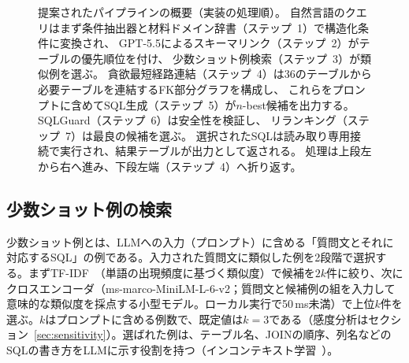 \documentclass[twocolumn]{interact}
\begin{document}
\begin{figure}[htbp]
{%
}%
\caption{提案されたパイプラインの概要（実装の処理順）。
  自然言語のクエリはまず条件抽出器と材料ドメイン辞書（ステップ~1）で構造化条件に変換され、
  GPT-5.5によるスキーマリンク（ステップ~2）がテーブルの優先順位を付け、
  少数ショット例検索（ステップ~3）が類似例を選ぶ。
  貪欲最短経路連結（ステップ~4）は36のテーブルから必要テーブルを連結するFK部分グラフを構成し、
  これらをプロンプトに含めてSQL生成（ステップ~5）が$n$-best候補を出力する。
  SQLGuard（ステップ~6）は安全性を検証し、
  リランキング（ステップ~7）は最良の候補を選ぶ。
  選択されたSQLは読み取り専用接続で実行され、結果テーブルが出力として返される。
  処理は上段左から右へ進み、下段左端（ステップ~4）へ折り返す。}
\label{fig:pipeline}
\end{figure}

\subsection{少数ショット例の検索}
\label{sec:fewshot}

少数ショット例とは、LLMへの入力（プロンプト）に含める「質問文とそれに対応するSQL」の例である。入力された質問文に類似した例を2段階で選択する。まずTF-IDF~\cite{salton1988tfidf}（単語の出現頻度に基づく類似度）で候補を$2k$件に絞り、次にクロスエンコーダ（ms-marco-MiniLM-L-6-v2；質問文と候補例の組を入力して意味的な類似度を採点する小型モデル。ローカル実行で50\,ms未満）で上位$k$件を選ぶ。$k$はプロンプトに含める例数で、既定値は$k=3$である（感度分析はセクション~\ref{sec:sensitivity}）。選ばれた例は、テーブル名、JOINの順序、列名などのSQLの書き方をLLMに示す役割を持つ（インコンテキスト学習~\cite{brown2020fewshot}）。
\end{document}
